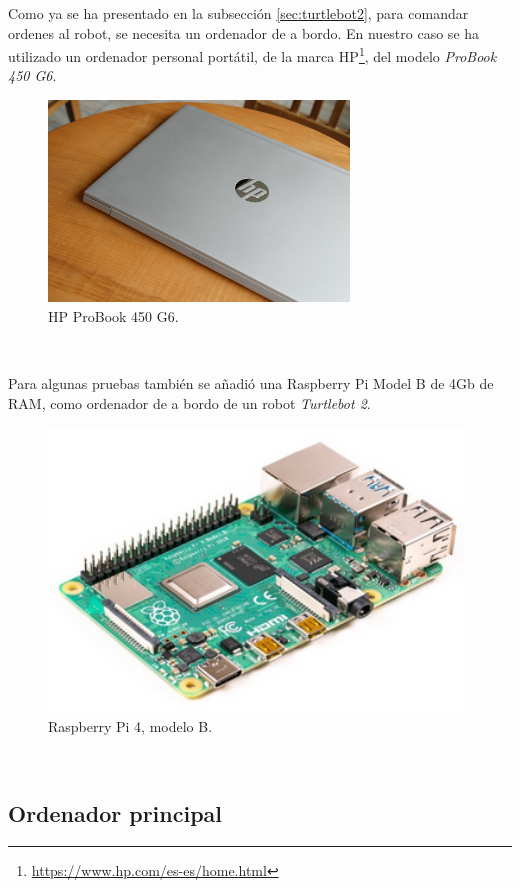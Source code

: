Como ya se ha presentado en la subsección \ref{sec:turtlebot2}, para comandar
ordenes al robot, se necesita un ordenador de a bordo.
En nuestro caso se ha utilizado un ordenador personal portátil, de la marca
HP\footnote{\url{https://www.hp.com/es-es/home.html}}, del modelo
\textit{ProBook 450 G6}.

\begin{figure} [h!]
  \begin{center}
    \includegraphics[width=8cm]{figs/hp_probook}
  \end{center}
  \caption{HP ProBook 450 G6.}
  \label{fig:hp_probook}
\end{figure}\

Para algunas pruebas también se añadió una Raspberry Pi Model B de 4Gb de RAM,
como ordenador de a bordo de un robot \textit{Turtlebot 2}.

\begin{figure} [h!]
  \begin{center}
    \includegraphics[width=11cm]{figs/raspberry_pi_4b}
  \end{center}
  \caption{Raspberry Pi 4, modelo B.}
  \label{fig:raspberry_pi}
\end{figure}\


\subsection{Ordenador principal}
\label{sec:ordenador_principal}

